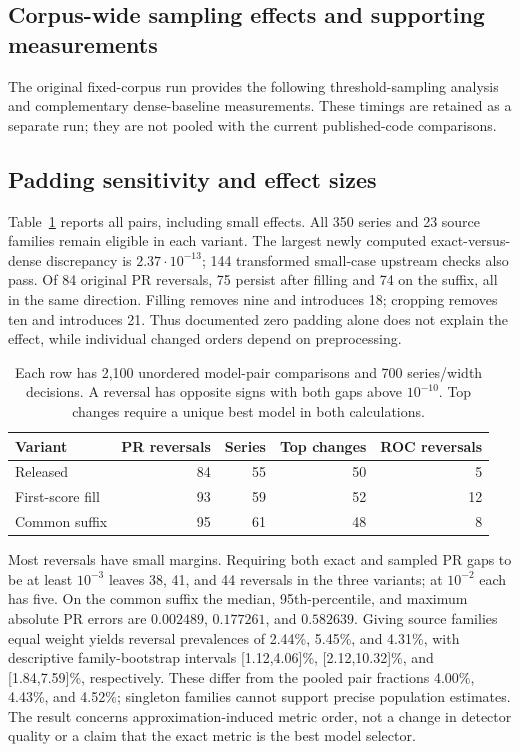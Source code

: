 \documentclass[10pt]{article}
\begin{document}
\subsection{Corpus-wide sampling effects and supporting measurements}
The original fixed-corpus run provides the following threshold-sampling
analysis and complementary dense-baseline measurements. These timings are
retained as a separate run; they are not pooled with the current published-code
comparisons.


\subsection{Padding sensitivity and effect sizes}
Table~\ref{tab:padding} reports all pairs, including small effects.
All 350 series and 23 source families remain eligible in each variant.
The largest newly computed exact-versus-dense discrepancy is
$2.37\cdot10^{-13}$; 144 transformed small-case upstream checks also pass.
Of 84 original PR reversals, 75 persist after filling and 74 on the suffix,
all in the same direction. Filling removes nine and introduces 18; cropping
removes ten and introduces 21. Thus documented zero padding alone does not
explain the effect, while individual changed orders depend on preprocessing.

\begin{table}[t]
\centering
\begin{tabular}{lrrrr}
\toprule
Variant & PR reversals & Series & Top changes & ROC reversals\\
\midrule
Released & 84 & 55 & 50 & 5\\
First-score fill & 93 & 59 & 52 & 12\\
Common suffix & 95 & 61 & 48 & 8\\
\bottomrule
\end{tabular}
\caption{Each row has 2,100 unordered model-pair comparisons and 700
series/width decisions. A reversal has opposite signs with both gaps
above $10^{-10}$. Top changes require a unique best model in both calculations.}
\label{tab:padding}
\end{table}

Most reversals have small margins. Requiring both exact and sampled PR gaps
to be at least $10^{-3}$ leaves 38, 41, and 44 reversals in the three variants;
at $10^{-2}$ each has five. On the common suffix the median, 95th-percentile,
and maximum absolute PR errors are $0.002489$, $0.177261$, and $0.582639$.
Giving source families equal weight yields reversal prevalences of
2.44\%, 5.45\%, and 4.31\%, with descriptive family-bootstrap intervals
[1.12,4.06]\%, [2.12,10.32]\%, and [1.84,7.59]\%, respectively.
These differ from the pooled pair fractions 4.00\%, 4.43\%, and 4.52\%;
singleton families cannot support precise population estimates.
The result concerns approximation-induced metric order, not a change in
detector quality or a claim that the exact metric is the best model selector.
\end{document}
